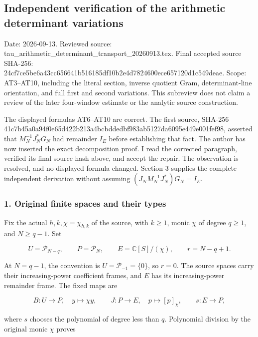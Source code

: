 \subsection{Independent verification of the arithmetic determinant variations}\label{endpoint-variation_review--independent-verification-of-the-arithmetic-determinant-variations}

Date: 2026-09-13. Reviewed source: tau\_arithmetic\_determinant\_transport\_20260913.tex. Final accepted source SHA-256: 24cf7ce5be6a43cc656641b516185df10b2e4d7824600ece657120d1c549deae. Scope: AT3--AT10, including the literal section, inverse quotient Gram, determinant-line orientation, and full first and second variations. This subreview does not claim a review of the later four-window estimate or the analytic source construction.

The displayed formulas AT6--AT10 are correct. The first source, SHA-256 41c7b45a0a94f0e65d422b213a4bcbddedbf983ab5127da6095e449e001fef98, asserted that \(M_N^{-1}J_N^*G_N\) had remainder \(I_E\) before establishing that fact. The author has now inserted the exact decomposition proof. I read the corrected paragraph, verified its final source hash above, and accept the repair. The observation is resolved, and no displayed formula changed. Section 3 supplies the complete independent derivation without assuming \((J_NM_N^{-1}J_N^*)G_N=I_E\).

\subsubsection{1. Original finite spaces and their types}\label{endpoint-variation_review--original-finite-spaces-and-their-types}

Fix the actual \(h,k,\chi=\chi_{h,k}\) of the source, with \(k\ge1\), monic \(\chi\) of degree \(q\ge1\), and \(N\ge q-1\). Set

\[
U=\mathcal P_{N-q},\qquad P=\mathcal P_N,\qquad
E=\mathbb C[S]/(\chi),\qquad r=N-q+1.
\tag{AV1}
\]

At \(N=q-1\), the convention is \(U=\mathcal P_{-1}=\{0\}\), so \(r=0\). The source spaces carry their increasing-power coefficient frames, and \(E\) has its increasing-power remainder frame. The fixed maps are

\[
B:U\longrightarrow P,\quad y\longmapsto\chi y,\qquad
J:P\longrightarrow E,\quad p\longmapsto[p]_\chi,\qquad
s:E\longrightarrow P,
\tag{AV2}
\]

where \(s\) chooses the polynomial of degree less than \(q\). Polynomial division by the original monic \(\chi\) proves

